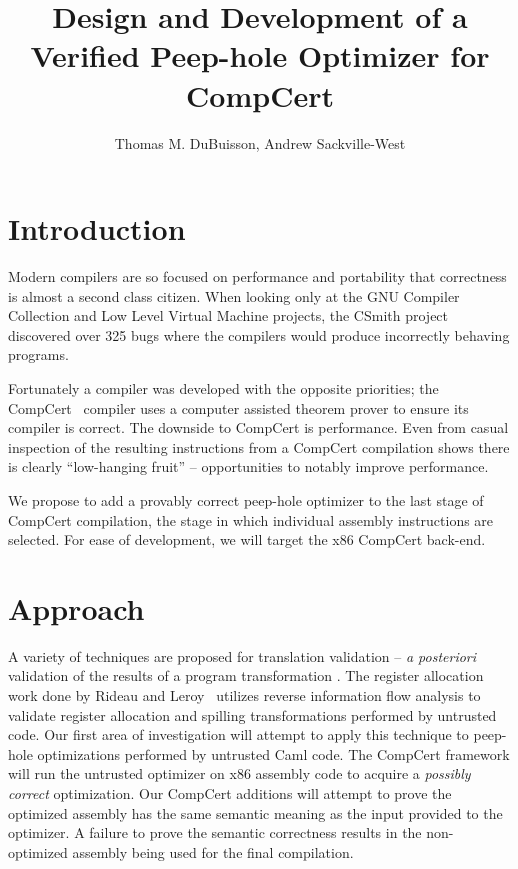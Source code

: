 \documentclass{exam}
\begin{document}
\title{Design and Development of a Verified Peep-hole Optimizer for CompCert}

\author{Thomas M. Du{B}uisson, Andrew Sackville-West}
\maketitle

\section{Introduction}
Modern compilers are so focused on performance and portability that
correctness is almost a second class citizen.  When looking only at
the GNU Compiler Collection and Low Level Virtual Machine projects,
the CSmith project~\cite{csmith} discovered over 325 bugs where the
compilers would produce incorrectly behaving programs.

Fortunately a compiler was developed with the opposite priorities; the
CompCert~\cite{compcert} compiler uses a computer assisted theorem
prover to ensure its compiler is correct.  The downside to CompCert is
performance.  Even from casual inspection of the resulting
instructions from a CompCert compilation shows there is clearly
``low-hanging fruit'' -- opportunities to notably improve performance.

We propose to add a provably correct peep-hole optimizer to the last
stage of CompCert compilation, the stage in which individual assembly
instructions are selected.  For ease of development, we will target
the x86 CompCert back-end.

\section{Approach}

A variety of techniques are proposed for translation validation --
{\it a posteriori} validation of the results of a program
transformation \cite{transval}. The register allocation work done by
Rideau and Leroy~\cite{regalloc} utilizes reverse information flow
analysis to validate register allocation and spilling transformations
performed by untrusted code. Our first area of investigation will
attempt to apply this technique to peep-hole optimizations performed
by untrusted Caml code.  The CompCert framework will run the untrusted
optimizer on x86 assembly code to acquire a {\it possibly correct}
optimization.  Our CompCert additions will attempt to prove the
optimized assembly has the same semantic meaning as the input provided
to the optimizer.  A failure to prove the semantic correctness results
in the non-optimized assembly being used for the final compilation.
\end{document}
